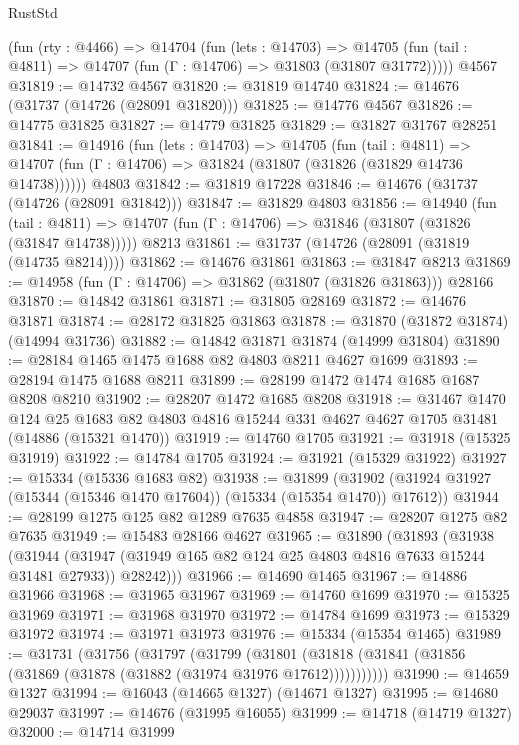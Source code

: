 \begin{lexlean}{RustStd}
\begin{coremodule}
    (fun (rty : @4466) =>
    @14704
      (fun (lets : @14703) =>
      @14705 (fun (tail : @4811) => @14707 (fun (Γ : @14706) => @31803 (@31807 @31772)))))
    @4567
@31819 := @14732 @4567
@31820 := @31819 @14740
@31824 := @14676 (@31737 (@14726 (@28091 @31820)))
@31825 := @14776 @4567
@31826 := @14775 @31825
@31827 := @14779 @31825
@31829 := @31827 @31767 @28251
@31841 := @14916
    (fun (lets : @14703) =>
    @14705
      (fun (tail : @4811) =>
      @14707 (fun (Γ : @14706) => @31824 (@31807 (@31826 (@31829 @14736 @14738))))))
    @4803
@31842 := @31819 @17228
@31846 := @14676 (@31737 (@14726 (@28091 @31842)))
@31847 := @31829 @4803
@31856 := @14940
    (fun (tail : @4811) => @14707 (fun (Γ : @14706) => @31846 (@31807 (@31826 (@31847 @14738)))))
    @8213
@31861 := @31737 (@14726 (@28091 (@31819 (@14735 @8214))))
@31862 := @14676 @31861
@31863 := @31847 @8213
@31869 := @14958 (fun (Γ : @14706) => @31862 (@31807 (@31826 @31863))) @28166
@31870 := @14842 @31861
@31871 := @31805 @28169
@31872 := @14676 @31871
@31874 := @28172 @31825 @31863
@31878 := @31870 (@31872 @31874) (@14994 @31736)
@31882 := @14842 @31871 @31874 (@14999 @31804)
@31890 := @28184 @1465 @1475 @1688 @82 @4803 @8211 @4627 @1699
@31893 := @28194 @1475 @1688 @8211
@31899 := @28199 @1472 @1474 @1685 @1687 @8208 @8210
@31902 := @28207 @1472 @1685 @8208
@31918 := @31467
    @1470
    @124
    @25
    @1683
    @82
    @4803
    @4816
    @15244
    @331
    @4627
    @4627
    @1705
    @31481
    (@14886 (@15321 @1470))
@31919 := @14760 @1705
@31921 := @31918 (@15325 @31919)
@31922 := @14784 @1705
@31924 := @31921 (@15329 @31922)
@31927 := @15334 (@15336 @1683 @82)
@31938 := @31899
    (@31902 (@31924 @31927 (@15344 (@15346 @1470 @17604)) (@15334 (@15354 @1470)) @17612))
@31944 := @28199 @1275 @125 @82 @1289 @7635 @4858
@31947 := @28207 @1275 @82 @7635
@31949 := @15483 @28166 @4627
@31965 := @31890
    (@31893
      (@31938
        (@31944 (@31947 (@31949 @165 @82 @124 @25 @4803 @4816 @7633 @15244 @31481 @27933)) @28242)))
@31966 := @14690 @1465
@31967 := @14886 @31966
@31968 := @31965 @31967
@31969 := @14760 @1699
@31970 := @15325 @31969
@31971 := @31968 @31970
@31972 := @14784 @1699
@31973 := @15329 @31972
@31974 := @31971 @31973
@31976 := @15334 (@15354 @1465)
@31989 := @31731
    (@31756
      (@31797
        (@31799
          (@31801 (@31818 (@31841 (@31856 (@31869 (@31878 (@31882 (@31974 @31976 @17612)))))))))))
@31990 := @14659 @1327
@31994 := @16043 (@14665 @1327) (@14671 @1327)
@31995 := @14680 @29037
@31997 := @14676 (@31995 @16055)
@31999 := @14718 (@14719 @1327)
@32000 := @14714 @31999

\end{coremodule}
\end{lexlean}
